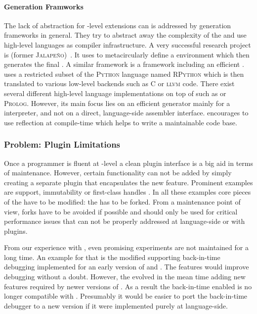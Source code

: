 \paragraph{\VM Generation Framworks}
The lack of abstraction for \VM-level extensions can is addressed by \VM generation frameworks in general.
They try to abstract away the complexity of the \VM and use high-level languages as compiler infrastructure.
A very successful research project is  (former \textsc{Jalapeño})~\cite{Alpe99a}.
It uses \Java to metacircularly define a \Java environment which then generates the final \VM.
A similar framework is  \cite{Rigo06a} a \VM framework including an efficient \JIT. 
\PyPy uses a restricted subset of the  \textsc{Python} language named \textsc{RPython} which is then translated to various low-level backends such as C or \textsc{llvm} code.
There exist several different high-level language \VM implementations on top of \PyPy such as \ST \cite{Bolz08a} or \textsc{Prolog}.
However, its main focus lies on an efficient \JIT generator mainly for a \Python interpreter, and not on a direct, language-side assembler interface.
\PyPy encourages to use reflection at compile-time which helps to write a maintainable code base.

\subsubsection*{Problem: Plugin Limitations}
Once a programmer is fluent at \VM-level a clean plugin interface is a big aid in terms of maintenance.
However, certain functionality can not be added by simply creating a separate plugin that encapsulates the new feature.
Prominent examples are \JIT support, immutability or first-class handles \cite{Arna13a}.
In all these examples core pieces of the \VM have to be modified: the \VM has to be forked.
From a \VM maintenance point of view, forks have to be avoided if possible and should only be used for critical performance issues that can not be properly addressed at language-side or with plugins.

From our experience with \PH, even promising \VM experiments are not maintained for a long time.
An example for that is the modified \VM supporting back-in-time debugging implemented for an early version of \PH and \Squeak \cite{Lien08b}.
The features would improve debugging without a doubt.
However, the \VM evolved in the mean time adding new features required by newer versions of \PH.
As a result the back-in-time enabled \VM is no longer compatible with \PH.
Presumably it would be easier to port the back-in-time debugger to a new \PH version if it were implemented purely at language-side.



